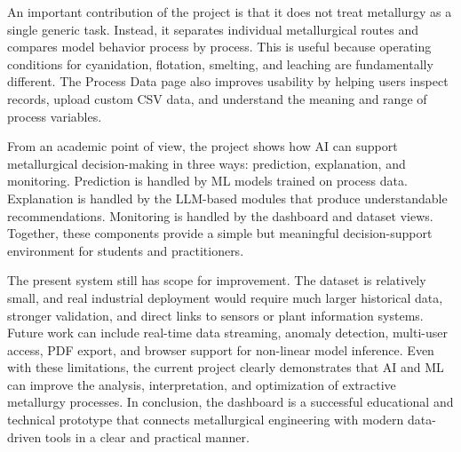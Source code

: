 \documentclass[12pt,a4paper]{article}
\begin{document}
An important contribution of the project is that it does not treat metallurgy as a single generic task. Instead, it separates individual metallurgical routes and compares model behavior process by process. This is useful because operating conditions for cyanidation, flotation, smelting, and leaching are fundamentally different. The Process Data page also improves usability by helping users inspect records, upload custom CSV data, and understand the meaning and range of process variables.

From an academic point of view, the project shows how AI can support metallurgical decision-making in three ways: prediction, explanation, and monitoring. Prediction is handled by ML models trained on process data. Explanation is handled by the LLM-based modules that produce understandable recommendations. Monitoring is handled by the dashboard and dataset views. Together, these components provide a simple but meaningful decision-support environment for students and practitioners.

The present system still has scope for improvement. The dataset is relatively small, and real industrial deployment would require much larger historical data, stronger validation, and direct links to sensors or plant information systems. Future work can include real-time data streaming, anomaly detection, multi-user access, PDF export, and browser support for non-linear model inference. Even with these limitations, the current project clearly demonstrates that AI and ML can improve the analysis, interpretation, and optimization of extractive metallurgy processes. In conclusion, the dashboard is a successful educational and technical prototype that connects metallurgical engineering with modern data-driven tools in a clear and practical manner.
\end{document}
